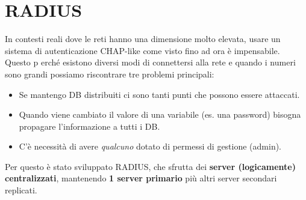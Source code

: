\chapter{RADIUS}
In contesti reali dove le reti hanno una dimensione molto elevata, usare un sistema di autenticazione CHAP-like come visto fino ad ora è impensabile. Questo p erché esistono diversi modi di connettersi alla rete e quando i numeri sono grandi possiamo riscontrare tre problemi principali:
\begin{itemize}
    \item Se mantengo DB distribuiti ci sono tanti punti che possono essere attaccati.
    \item Quando viene cambiato il valore di una variabile (es. una password) bisogna propagare l'informazione a tutti i DB.
    \item C'è necessità di avere \textit{qualcuno} dotato di permessi di gestione (admin).
\end{itemize}
Per questo è stato sviluppato RADIUS, che sfrutta dei \textbf{server (logicamente) centralizzati}, mantenendo \textbf{1 server primario} più altri server secondari replicati.
